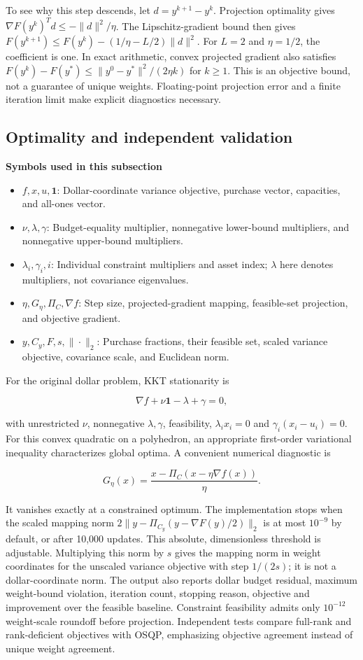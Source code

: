 \documentclass[
  american,
  11pt,
]{article}
\begin{document}
To see why this step descends, let \(d=y^{k+1}-y^k\). Projection
optimality gives \(\nabla F(y^k)^Td\le-\|d\|^2/\eta\). The
Lipschitz-gradient bound then gives
\(F(y^{k+1})\le F(y^k)-(1/\eta-L/2)\|d\|^2\). For \(L=2\) and
\(\eta=1/2\), the coefficient is one. In exact arithmetic, convex
projected gradient also satisfies
\(F(y^k)-F(y^*)\le\|y^0-y^*\|^2/(2\eta k)\) for \(k\ge1\). This is an
objective bound, not a guarantee of unique weights. Floating-point
projection error and a finite iteration limit make explicit diagnostics
necessary.

\subsection{Optimality and independent
validation}\label{optimality-and-independent-validation}

\textbf{Symbols used in this subsection}
\begin{itemize}
\item \(f,x,u,\mathbf1\): Dollar-coordinate variance objective, purchase vector, capacities, and all-ones vector.
\item \(\nu,\lambda,\gamma\): Budget-equality multiplier, nonnegative lower-bound multipliers, and nonnegative upper-bound multipliers.
\item \(\lambda_i,\gamma_i,i\): Individual constraint multipliers and asset index; $\lambda$ here denotes multipliers, not covariance eigenvalues.
\item \(\eta,G_\eta,\Pi_C,\nabla f\): Step size, projected-gradient mapping, feasible-set projection, and objective gradient.
\item \(y,C_y,F,s,\|\cdot\|_2\): Purchase fractions, their feasible set, scaled variance objective, covariance scale, and Euclidean norm.
\end{itemize}


For the original dollar problem, KKT stationarity is

\[\nabla f+\nu\mathbf1-\lambda+\gamma=0,\]

with unrestricted \(\nu\), nonnegative \(\lambda,\gamma\), feasibility, \(\lambda_ix_i=0\) and
\(\gamma_i(x_i-u_i)=0\). For this convex quadratic on a polyhedron, an
appropriate first-order variational inequality characterizes global
optima. A convenient numerical diagnostic is

\[G_\eta(x)=\frac{x-\Pi_C(x-\eta\nabla f(x))}{\eta}.\]

It vanishes exactly at a constrained optimum. The implementation stops
when the scaled mapping norm \(2\|y-\Pi_{C_y}(y-\nabla F(y)/2)\|_2\) is at
most \(10^{-9}\) by default, or after 10,000 updates. This absolute,
dimensionless threshold is adjustable. Multiplying this norm by \(s\)
gives the mapping norm in weight coordinates for the unscaled variance
objective with step \(1/(2s)\); it is not a dollar-coordinate norm. The
output also reports dollar budget residual, maximum weight-bound
violation, iteration count, stopping reason, objective and improvement
over the feasible baseline. Constraint feasibility admits only
\(10^{-12}\) weight-scale roundoff before projection. Independent tests
compare full-rank and rank-deficient objectives with OSQP, emphasizing
objective agreement instead of unique weight agreement.
\end{document}
